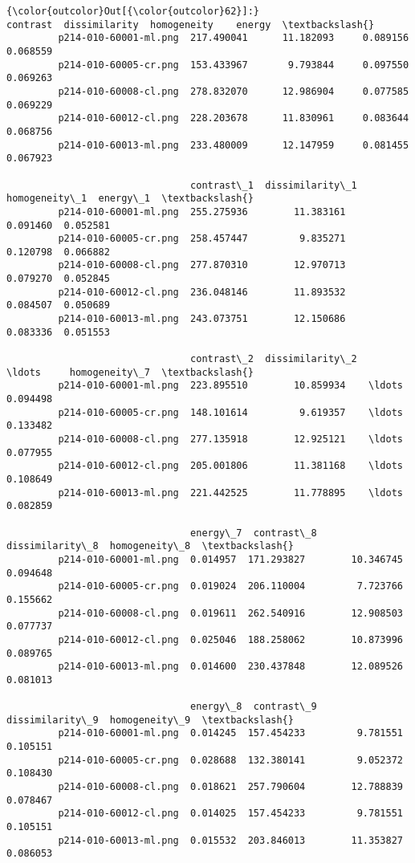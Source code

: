             \begin{Verbatim}[commandchars=\\\{\}]
{\color{outcolor}Out[{\color{outcolor}62}]:}                          contrast  dissimilarity  homogeneity    energy  \textbackslash{}
         p214-010-60001-ml.png  217.490041      11.182093     0.089156  0.068559
         p214-010-60005-cr.png  153.433967       9.793844     0.097550  0.069263
         p214-010-60008-cl.png  278.832070      12.986904     0.077585  0.069229
         p214-010-60012-cl.png  228.203678      11.830961     0.083644  0.068756
         p214-010-60013-ml.png  233.480009      12.147959     0.081455  0.067923

                                contrast\_1  dissimilarity\_1  homogeneity\_1  energy\_1  \textbackslash{}
         p214-010-60001-ml.png  255.275936        11.383161       0.091460  0.052581
         p214-010-60005-cr.png  258.457447         9.835271       0.120798  0.066882
         p214-010-60008-cl.png  277.870310        12.970713       0.079270  0.052845
         p214-010-60012-cl.png  236.048146        11.893532       0.084507  0.050689
         p214-010-60013-ml.png  243.073751        12.150686       0.083336  0.051553

                                contrast\_2  dissimilarity\_2    \ldots     homogeneity\_7  \textbackslash{}
         p214-010-60001-ml.png  223.895510        10.859934    \ldots          0.094498
         p214-010-60005-cr.png  148.101614         9.619357    \ldots          0.133482
         p214-010-60008-cl.png  277.135918        12.925121    \ldots          0.077955
         p214-010-60012-cl.png  205.001806        11.381168    \ldots          0.108649
         p214-010-60013-ml.png  221.442525        11.778895    \ldots          0.082859

                                energy\_7  contrast\_8  dissimilarity\_8  homogeneity\_8  \textbackslash{}
         p214-010-60001-ml.png  0.014957  171.293827        10.346745       0.094648
         p214-010-60005-cr.png  0.019024  206.110004         7.723766       0.155662
         p214-010-60008-cl.png  0.019611  262.540916        12.908503       0.077737
         p214-010-60012-cl.png  0.025046  188.258062        10.873996       0.089765
         p214-010-60013-ml.png  0.014600  230.437848        12.089526       0.081013

                                energy\_8  contrast\_9  dissimilarity\_9  homogeneity\_9  \textbackslash{}
         p214-010-60001-ml.png  0.014245  157.454233         9.781551       0.105151
         p214-010-60005-cr.png  0.028688  132.380141         9.052372       0.108430
         p214-010-60008-cl.png  0.018621  257.790604        12.788839       0.078467
         p214-010-60012-cl.png  0.014025  157.454233         9.781551       0.105151
         p214-010-60013-ml.png  0.015532  203.846013        11.353827       0.086053


\end{Verbatim}
